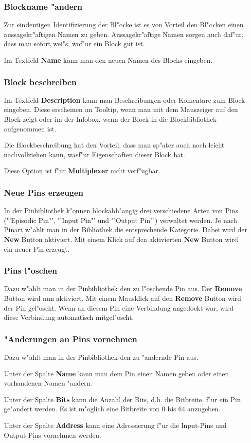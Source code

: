 \documentclass[a4paper,titlepage,12pt,ngerman]{scrbook}
\begin{document}
\subsubsection{Blockname "andern}
Zur eindeutigen Identifizierung der Bl"ocke ist es von Vorteil den Bl"ocken einen aussagekr"aftigen Namen zu geben. Aussagekr"aftige Namen sorgen auch daf"ur, dass man sofort wei"s, wof"ur ein Block gut ist. \par
Im Textfeld {\bf Name} kann man den neuen Namen des Blocks eingeben.
\subsubsection{Block beschreiben}
Im Textfeld {\bf Description} kann man Beschreibungen oder Komentare zum Block eingeben. Diese erscheinen im Tooltip, wenn man mit dem Mauszeiger auf den Block zeigt oder im der Infobox, wenn der Block in die Blockbibliothek aufgenommen ist.\par
Die Blockbeschreibung hat den Vorteil, dass man sp"ater auch noch leicht nachvollziehen kann, wasf"ur Eigenschaften dieser Block hat.\par
Diese Option ist f"ur {\bf Multiplexer} nicht verf"ugbar.
\subsubsection{Neue Pins erzeugen}
In der Pinbibliothek k"onnen blockabh"angig drei verschiedene Arten von Pins ("'Episodic Pin"', "'Input Pin"' und "'Output Pin"') verwaltet werden. Je nach Pinart w"ahlt man in der Bibliothek die entsprechende Kategorie. Dabei wird der {\bf New} Button aktiviert. Mit einem Klick auf den aktivierten {\bf New} Button wird ein neuer Pin erzeugt. \par
\subsubsection{Pins l"oschen}
Dazu w"ahlt man in der Pinbibliothek den zu l"oschende Pin aus. Der {\bf Remove} Button wird nun aktiviert. Mit einem Mausklick auf den {\bf Remove} Button wird der Pin gel"oscht. Wenn an diesem Pin eine Verbindung angedockt war, wird diese Verbindung automatisch mitgel"oscht.
\subsubsection{"Anderungen an Pins vornehmen}
Dazu w"ahlt man in der Pinbibliothek den zu "andernde Pin aus.\par
Unter der Spalte {\bf Name} kann man dem Pin einen Namen geben oder einen vorhandenen Namen "andern.\par
Unter der Spalte {\bf Bits} kann die Anzahl der Bits, d.h. die Bitbreite, f"ur ein Pin ge"andert werden. Es ist m"oglich eine Bitbreite von 0 bis 64 anzugeben.\par
Unter der Spalte {\bf Address} kann eine Adressierung f"ur die Input-Pins und Output-Pins vornehmen werden.\par
\end{document}
